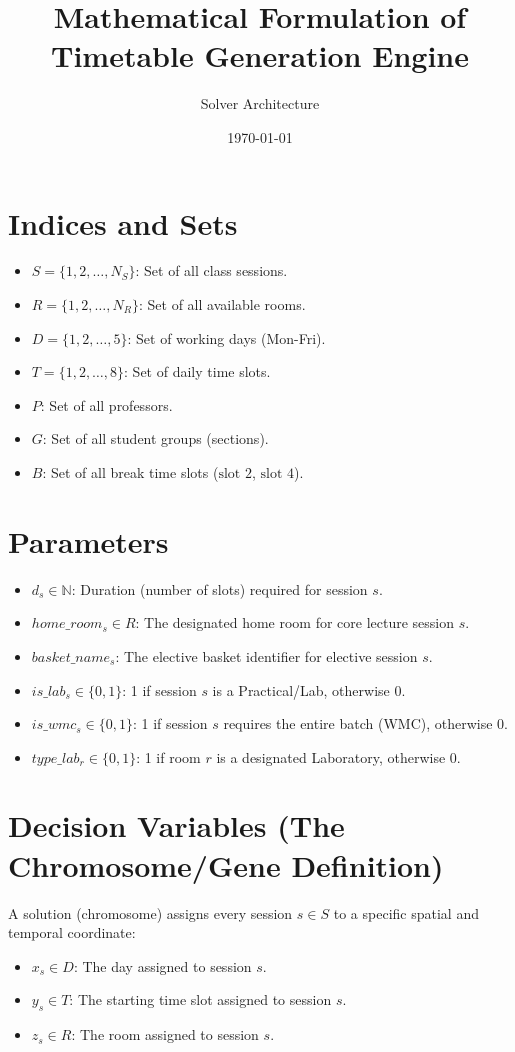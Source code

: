 \documentclass[12pt,a4paper]{article}
\title{Mathematical Formulation of Timetable Generation Engine}
\author{Solver Architecture}
\date{\today}
\begin{document}
\maketitle

\section{Indices and Sets}
\begin{itemize}
    \item $S = \{1, 2, \dots, N_S\}$: Set of all class sessions.
    \item $R = \{1, 2, \dots, N_R\}$: Set of all available rooms.
    \item $D = \{1, 2, \dots, 5\}$: Set of working days (Mon-Fri).
    \item $T = \{1, 2, \dots, 8\}$: Set of daily time slots.
    \item $P$: Set of all professors.
    \item $G$: Set of all student groups (sections).
    \item $B$: Set of all break time slots ($\text{slot } 2$, $\text{slot } 4$).
\end{itemize}

\section{Parameters}
\begin{itemize}
    \item $d_s \in \mathbb{N}$: Duration (number of slots) required for session $s$.
    \item $home\_room_s \in R$: The designated home room for core lecture session $s$.
    \item $basket\_name_s$: The elective basket identifier for elective session $s$.
    \item $is\_lab_s \in \{0, 1\}$: 1 if session $s$ is a Practical/Lab, otherwise 0.
    \item $is\_wmc_s \in \{0, 1\}$: 1 if session $s$ requires the entire batch (WMC), otherwise 0.
    \item $type\_lab_r \in \{0, 1\}$: 1 if room $r$ is a designated Laboratory, otherwise 0.
\end{itemize}

\section{Decision Variables (The Chromosome/Gene Definition)}
A solution (chromosome) assigns every session $s \in S$ to a specific spatial and temporal coordinate:
\begin{itemize}
    \item $x_s \in D$: The day assigned to session $s$.
    \item $y_s \in T$: The starting time slot assigned to session $s$.
    \item $z_s \in R$: The room assigned to session $s$.
\end{itemize}
\end{document}
